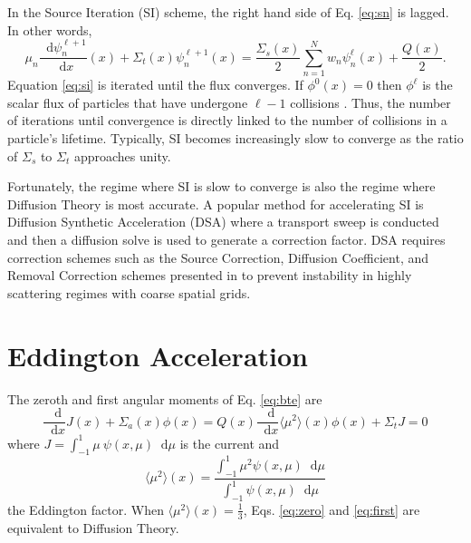 \documentclass{anstrans}
\newcommand{\ud}{\mathop{}\!\mathrm{d}} %
\newcommand{\dderiv}[2]{\frac{\ud #1}{\ud #2}}
\newcommand{\edd}{\langle \mu^2 \rangle}
\begin{document}
	In the Source Iteration (SI) scheme, the right hand side of Eq. \ref{eq:sn} is lagged. In other words, 
		\begin{equation} \label{eq:si}
			\mu_n \dderiv{\psi_n^{\ell+1}}{x}(x) + \Sigma_t(x) \psi_n^{\ell+1}(x) = 
			\frac{\Sigma_s(x)}{2} \sum_{n=1}^N w_n \psi_n^\ell(x) + \frac{Q(x)}{2}. 
		\end{equation}
	Equation \ref{eq:si} is iterated until the flux converges. If $\phi^0(x) = 0$ then $\phi^\ell$ is the scalar flux of particles that have undergone $\ell - 1$ collisions \cite{adams}. Thus, the number of iterations until convergence is directly linked to the number of collisions in a particle's lifetime. Typically, SI becomes increasingly slow to converge as the ratio of $\Sigma_s$ to $\Sigma_t$ approaches unity. 

	Fortunately, the regime where SI is slow to converge is also the regime where Diffusion Theory is most accurate. A popular method for accelerating SI is Diffusion Synthetic Acceleration (DSA) where a transport sweep is conducted and then a diffusion solve is used to generate a correction factor. DSA requires correction schemes such as the Source Correction, Diffusion Coefficient, and Removal Correction schemes presented in \cite{alcouffe} to prevent instability in highly scattering regimes with coarse spatial grids. 

\section{Eddington Acceleration}
	The zeroth and first angular moments of Eq. \ref{eq:bte} are 
		\begin{subequations} 
		\begin{equation} \label{eq:zero}
			\dderiv{}{x} J(x) + \Sigma_a(x) \phi(x) = Q(x) 
		\end{equation} 
		\begin{equation} \label{eq:first}
			\frac{\ud}{\ud x} \edd(x) \phi(x) + \Sigma_t J = 0  
		\end{equation}
		\end{subequations}
	where $J = \int_{-1}^{1} \mu \ \psi(x, \mu) \ud \mu$ is the current and 
		\begin{equation} \label{eq:eddington} 
			\edd(x) = \frac{\int_{-1}^1 \mu^2 \psi(x, \mu) \ud \mu}{\int_{-1}^1 \psi(x, \mu) \ud \mu}
		\end{equation}
	the Eddington factor. When $\edd(x) = \frac{1}{3}$, Eqs. \ref{eq:zero} and \ref{eq:first} are equivalent to Diffusion Theory. 
\end{document}
